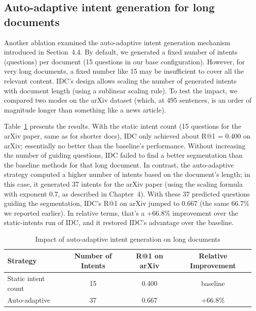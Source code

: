 \documentclass[12pt,a4paper]{report}
\begin{document}
\subsection{Auto-adaptive intent generation for long documents}\label{sec:adaptive-intents}

Another ablation examined the auto-adaptive intent generation mechanism introduced in Section~4.4. By default, we generated a fixed number of intents (questions) per document (15 questions in our base configuration). However, for very long documents, a fixed number like 15 may be insufficient to cover all the relevant content. IDC's design allows scaling the number of generated intents with document length (using a sublinear scaling rule). To test the impact, we compared two modes on the arXiv dataset (which, at 495 sentences, is an order of magnitude longer than something like a news article).

Table~\ref{tab:adaptive_intents} presents the results. With the static intent count (15 questions for the arXiv paper, same as for shorter docs), IDC only achieved about R@1 = 0.400 on arXiv; essentially no better than the baseline's performance. Without increasing the number of guiding questions, IDC failed to find a better segmentation than the baseline methods for that long document. In contrast, the auto-adaptive strategy computed a higher number of intents based on the document's length; in this case, it generated 37 intents for the arXiv paper (using the scaling formula with exponent 0.7, as described in Chapter~4). With these 37 predicted questions guiding the segmentation, IDC's R@1 on arXiv jumped to 0.667 (the same 66.7\% we reported earlier). In relative terms, that's a +66.8\% improvement over the static-intents run of IDC, and it restored IDC's advantage over the baseline.

\begin{table}[h!]
\centering
\caption{Impact of auto-adaptive intent generation on long documents}
\label{tab:adaptive_intents}
\begin{tabular}{lccc}
\hline
\textbf{Strategy} & \textbf{Number of Intents} & \textbf{R@1 on arXiv} & \textbf{Relative Improvement} \\
\hline
Static intent count & 15 & 0.400 & baseline \\
Auto-adaptive & 37 & 0.667 & +66.8\% \\
\hline
\end{tabular}
\end{table}
\end{document}
